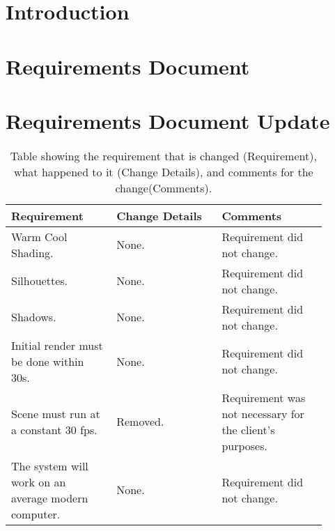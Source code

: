 \documentclass[10pt,journal,compsoc,draftclsnofoot]{IEEEtran}
\begin{document}
\begin{flushleft}

\tableofcontents

\newpage

\section{Introduction}


\newpage

\section{Requirements Document}

\newpage



\section{Requirements Document Update}

\begin{center}
\begin{table}[H]
\caption{Table showing the requirement that is changed (Requirement), what happened to it (Change Details), and comments for the change(Comments).}
\begin{tabular}{ | p{0.3\linewidth} | p{0.3\linewidth} | p{0.3\linewidth} | }
\hline
\textbf{Requirement}  & \textbf{Change Details}  & \textbf{Comments} \\ \hline

Warm Cool Shading. & 
None. & 
Requirement did not change. \\ \hline

Silhouettes. & 
None. & 
Requirement did not change. \\ \hline

Shadows. & 
None. & 
Requirement did not change. \\ \hline

Initial render must be done within 30s. & 
None. & 
Requirement did not change. \\ \hline

Scene must run at a constant 30 fps. & 
Removed. & 
Requirement was not necessary for the client's purposes. \\ \hline

The system will work on an average modern computer. &
None. &
Requirement did not change. \\ \hline


\end{tabular}
\end{table}
\end{center}
\end{flushleft}
\end{document}
